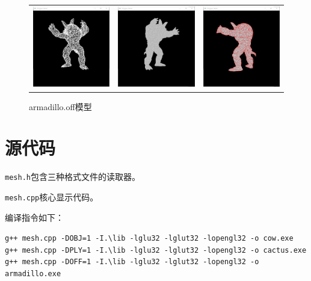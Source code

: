 \documentclass[logo,reportComp]{thesis}
\begin{document}
\begin{figure}[H]
\centering
\begin{tabular}{ccc}
\includegraphics[width=0.33\linewidth]{fig/armadillo1.png} &
\includegraphics[width=0.33\linewidth]{fig/armadillo2.png} &
\includegraphics[width=0.33\linewidth]{fig/armadillo3.png}
\end{tabular}
\caption{armadillo.off模型}
\label{fig:armadillo}
\end{figure}

\appendixconfig
\appendix
\section{源代码}

\verb'mesh.h'包含三种格式文件的读取器。


\verb'mesh.cpp'核心显示代码。


编译指令如下：
\begin{flushleft}
\verb'g++ mesh.cpp -DOBJ=1 -I.\lib -lglu32 -lglut32 -lopengl32 -o cow.exe'\\
\verb'g++ mesh.cpp -DPLY=1 -I.\lib -lglu32 -lglut32 -lopengl32 -o cactus.exe'\\
\verb'g++ mesh.cpp -DOFF=1 -I.\lib -lglu32 -lglut32 -lopengl32 -o armadillo.exe'
\end{flushleft}
\end{document}

